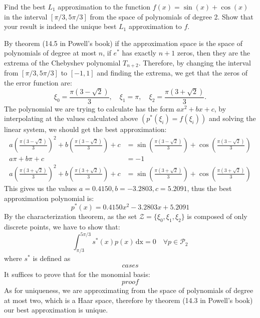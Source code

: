 \begin{problem}
Find the best $L_1$ approximation to the function $f(x) = \sin(x) + \cos(x)$ in the interval $[\pi/3, 5\pi/3]$ from the space of polynomials of degree 2. Show that your result is indeed the unique best $L_1$ approximation to $f$.
\end{problem}

\begin{solution}
By theorem (14.5 in Powell's book) if the approximation space is the space of polynomials of degree at most $n$, if $e^*$ has exactly $n+1$ zeros, then they are the extrema of the Chebyshev polynomial $T_{n+2}$. Therefore, by changing the interval from $[\pi/3, 5\pi/3]$ to $[-1,1]$ and finding the extrema, we get that the zeros of the error function are:
\begin{equation*}
\xi_0 = \frac{\pi(3-\sqrt{2})}{3}, \quad \xi_1 = \pi, \quad \xi_2 = \frac{\pi(3+\sqrt{2})}{3}.
\end{equation*}
The polynomial we are trying to calculate has the form $ax^2+bx+c$, by interpolating at the values calculated above $(p^*(\xi_i) = f(\xi_i))$ and solving the linear system, we should get the best approximation:
\begin{align*}
a(\frac{\pi(3-\sqrt{2})}{3})^2+b(\frac{\pi(3-\sqrt{2})}{3})+c &= \sin(\frac{\pi(3-\sqrt{2})}{3}) + \cos(\frac{\pi(3-\sqrt{2})}{3}) \\
a \pi + b\pi +c &=-1 \\
a(\frac{\pi(3+\sqrt{2})}{3})^2 +b(\frac{\pi(3+\sqrt{2})}{3}) + c &= \sin(\frac{\pi(3+\sqrt{2})}{3}) + \cos(\frac{\pi(3+\sqrt{2})}{3})
\end{align*}
This gives us the values $a=0.4150, b = -3.2803, c = 5.2091$, thus the best approximation polynomial is:
\begin{equation*}
p^*(x)=0.4150x^2 -3.2803x+5.2091
\end{equation*}
By the characterization theorem, as the set $\mathcal{Z} = \{\xi_0, \xi_1, \xi_2 \}$ is composed of only discrete points, we have to show that:
\begin{equation*}
\int_{\pi/3}^{5\pi/3} s^*(x)p(x) \, \text{dx} = 0 \quad \forall p \in \mathcal{P}_2
\end{equation*}
where $s^*$ is defined as
\begin{align*}
cases
\end{align*}
It suffices to prove that for the monomial basis:
\begin{equation*}
proof
\end{equation*}
As for uniqueness, we are approximating from the space of polynomials of degree at most two, which is a Haar space, therefore by theorem (14.3 in Powell's book) our best approximation is unique.
\end{solution}

